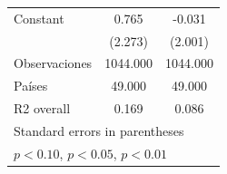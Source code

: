 \begin{table}[htbp]
\begin{tabular}{l*{2}{c}}
\addlinespace
Constant            &       0.765         &      -0.031         \\
                    &     (2.273)         &     (2.001)         \\
\midrule
Observaciones       &    1044.000         &    1044.000         \\
Países              &      49.000         &      49.000         \\
R2 overall          &       0.169         &       0.086         \\
\bottomrule
\multicolumn{3}{l}{\footnotesize Standard errors in parentheses}\\
\multicolumn{3}{l}{\footnotesize \sym{*} \(p<0.10\), \sym{**} \(p<0.05\), \sym{***} \(p<0.01\)}\\
\end{tabular}
\end{table}
